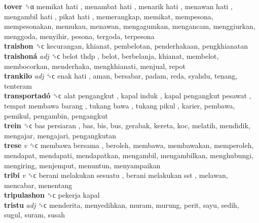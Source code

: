 \textbf{tover} ␝α   memikat hati ,  menambat hati ,  menarik hati ,  menawan hati ,  mengambil hati ,  pikat hati , memerangkap, memikat, mempesona, mempesonakan, memukau, menawan, mengagumkan, mengancam, menggiurkan, menggoda, menyihir, pesona, tergoda, terpesona  \\
\textbf{traishon} ␝ϲ  kecurangan, khianat, pembelotan, penderhakaan, pengkhianatan  \\
\textbf{traishoná} \emph{adj}  ␝ϲ   belot thdp , belot, berbelanja, khianat, membelot, membocorkan, menderhaka, mengkhianati, menjual, repot  \\
\textbf{trankilo} \emph{adj}  ␝ϲ   enak hati , aman, bersabar, padam, reda, syahdu, tenang, tenteram  \\
\textbf{transportadó} ␝ϲ   alat pengangkut ,  kapal induk ,  kapal pengangkut pesawat ,  tempat membawa barang ,  tukang bawa ,  tukang pikul , karier, pembawa, pemikul, pengambin, pengangkut  \\
\textbf{trein} ␝ϲ   bas persiaran , bas, bis, bus, gerabak, kereta, koc, melatih, mendidik, mengajar, mengajari, pengangkutan  \\
\textbf{trese} \emph{v}  ␝ϲ   membawa bersama , beroleh, membawa, membawakan, memperoleh, mendapat, mendapati, mendapatkan, mengambil, mengambilkan, menghubungi, mengiring, menjemput, menuntun, menyampaikan  \\
\textbf{tribi} \emph{v}  ␝ϲ   berani melakukan sesuatu ,  berani melakukan sst , melawan, mencabar, menentang  \\
\textbf{tripulashon} ␝ϲ   pekerja kapal   \\
\textbf{tristu} \emph{adj}  ␝ϲ  menderita, menyedihkan, muram, murung, perit, sayu, sedih, sugul, suram, susah  \\
